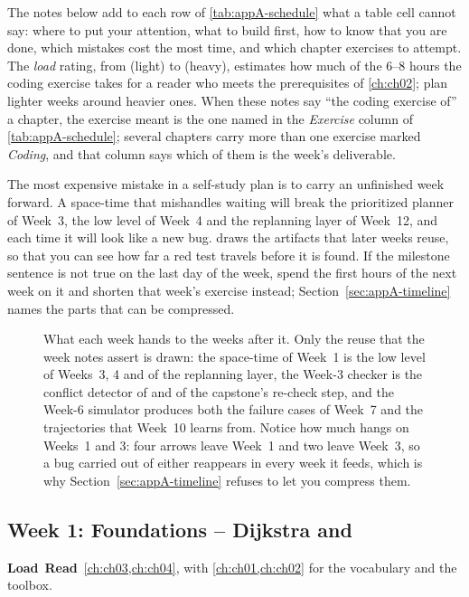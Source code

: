 The notes below add to each row of \cref{tab:appA-schedule} what a table cell cannot say:
where to put your attention, what to build first, how to know that you are done, which
mistakes cost the most time, and which chapter exercises to attempt. The \emph{load}
rating, from  (light) to  (heavy), estimates how much of the
6--8 hours the coding exercise takes for a reader who meets the prerequisites of
\cref{ch:ch02}; plan lighter weeks around heavier ones. When these notes say ``the coding
exercise of'' a chapter, the exercise meant is the one named in the \emph{Exercise} column
of \cref{tab:appA-schedule}; several chapters carry more than one exercise marked
\emph{Coding}, and that column says which of them is the week's deliverable.

\begin{pitfall}
The most expensive mistake in a self-study plan is to carry an unfinished week forward. A
space-time \astar that mishandles waiting will break the prioritized planner of Week~3,
the \cbs low level of Week~4 and the replanning layer of Week~12, and each time it will
look like a new bug.  draws the artifacts that later weeks
reuse, so that you can see how far a red test travels before it is found. If the milestone sentence is not true on the last day of the week,
spend the first hours of the next week on it and shorten that week's exercise instead;
Section~\ref{sec:appA-timeline} names the parts that can be compressed.
\end{pitfall}

\begin{figure}[htb]
\centering
{}
\caption{What each week hands to the weeks after it. Only the reuse that the week notes
assert is drawn: the space-time \astar of Week~1 is the low level of Weeks~3, 4 and of the
replanning layer, the Week-3 checker is the conflict detector of \cbs and of the capstone's
re-check step, and the Week-6 simulator produces both the failure cases of Week~7 and the
trajectories that Week~10 learns from. Notice how much hangs on Weeks~1 and 3: four arrows leave Week~1 and
two leave Week~3, so a bug carried out of either reappears in every week it feeds, which is why
Section~\ref{sec:appA-timeline} refuses to let you compress them.}
\label{fig:appA-week-dependencies}
\end{figure}

\subsection{Week 1: Foundations -- Dijkstra and \astar}
\label{sec:appA-week01}
\noindent\textbf{Load}\ \quad\textbf{Read}\ \cref{ch:ch03,ch:ch04}, with
\cref{ch:ch01,ch:ch02} for the vocabulary and the toolbox.

